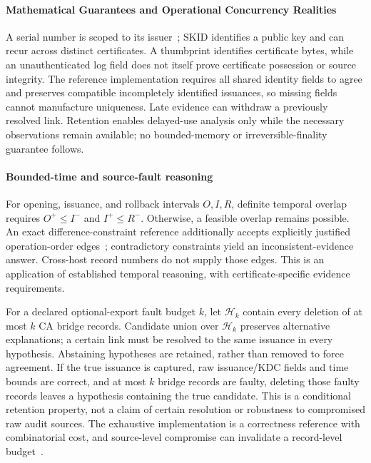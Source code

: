 \paragraph{Mathematical Guarantees and Operational Concurrency Realities}
A serial number is scoped to its issuer~\cite{rfc5280}; SKID identifies a public key and can recur across distinct certificates. A thumbprint identifies certificate bytes, while an unauthenticated log field does not itself prove certificate possession or source integrity. The reference implementation requires all shared identity fields to agree and preserves compatible incompletely identified issuances, so missing fields cannot manufacture uniqueness. Late evidence can withdraw a previously resolved link. Retention enables delayed-use analysis only while the necessary observations remain available; no bounded-memory or irreversible-finality guarantee follows.

\paragraph{Bounded-time and source-fault reasoning}
For opening, issuance, and rollback intervals $O,I,R$, definite temporal overlap requires $O^{+}\le I^{-}$ and $I^{+}\le R^{-}$. Otherwise, a feasible overlap remains possible. An exact difference-constraint reference additionally accepts explicitly justified operation-order edges~\cite{dechter1991temporal,amarilli2019computing}; contradictory constraints yield an inconsistent-evidence answer. Cross-host record numbers do not supply those edges. This is an application of established temporal reasoning, with certificate-specific evidence requirements.

For a declared optional-export fault budget $k$, let $\mathcal{H}_k$ contain every deletion of at most $k$ CA bridge records. Candidate union over $\mathcal{H}_k$ preserves alternative explanations; a certain link must be resolved to the same issuance in every hypothesis. Abstaining hypotheses are retained, rather than removed to force agreement. If the true issuance is captured, raw issuance/KDC fields and time bounds are correct, and at most $k$ bridge records are faulty, deleting those faulty records leaves a hypothesis containing the true candidate. This is a conditional retention property, not a claim of certain resolution or robustness to compromised raw audit sources. The exhaustive implementation is a correctness reference with combinatorial cost, and source-level compromise can invalidate a record-level budget~\cite{elmagarmid2007duplicate,heinzl2026timestamps}.

